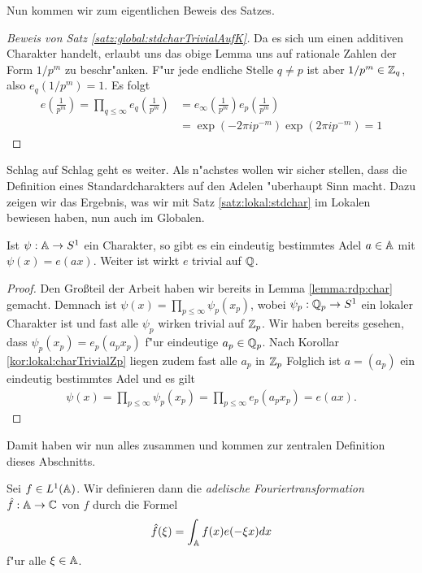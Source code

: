 	Nun kommen wir zum eigentlichen Beweis des Satzes.
	\begin{proof}[Beweis von Satz \ref{satz:global:stdcharTrivialAufK}]
		Da es sich um einen additiven Charakter handelt, erlaubt uns das obige Lemma uns auf rationale Zahlen der Form $1/p^m$ zu beschr"anken.
		F"ur jede endliche Stelle $q\not=p$ ist aber $1/p^m \in \mathbb{Z}_q$, also $e_q(1/p^m) =1$.
		Es folgt
		\begin{align*}
			e\left( \frac{1}{p^m} \right) 	= \prod_{q\leq \infty} e_q\left( \frac{1}{p^m} \right) 
											&= e_\infty \left( \frac{1}{p^m} \right) e_p\left( \frac{1}{p^m} \right)\\
											&= \exp(-2\pi i p^{-m}) \exp(2\pi i p^{-m}) = 1
		\end{align*}
	\end{proof}
	
	Schlag auf Schlag geht es weiter. 
	Als n"achstes wollen wir sicher stellen, dass die Definition eines Standardcharakters auf den Adelen "uberhaupt Sinn macht.
	Dazu zeigen wir das Ergebnis, was wir mit Satz \ref{satz:lokal:stdchar} im Lokalen bewiesen haben, nun auch im Globalen.
	\begin{satz}
		Ist $\psi: \mathbb{A} \to S^1$ ein Charakter, so gibt es ein eindeutig bestimmtes Adel $a\in\mathbb{A}$ mit $\psi(x) = e(ax)$.
		Weiter ist wirkt $e$ trivial auf $\mathbb{Q}$.
	\end{satz}
	\begin{proof}
		Den Großteil der Arbeit haben wir bereits in Lemma \ref{lemma:rdp:char} gemacht. Demnach ist $\psi(x) = \prod_{p\leq\infty} \psi_p (x_p)$, wobei $\psi_p: {\mathbb{Q}_p} \to S^1$ ein lokaler Charakter ist und fast alle $\psi_p$ wirken trivial auf ${\mathbb{Z}_p}$.
		Wir haben bereits gesehen, dass $\psi_p (x_p) = e_p(a_p x_p)$ f"ur eindeutige $a_p \in {\mathbb{Q}_p}$.
		Nach Korollar \ref{kor:lokal:charTrivialZp} liegen zudem fast alle $a_p$ in ${\mathbb{Z}_p}$
		Folglich ist $a = (a_p)$ ein eindeutig bestimmtes Adel und es gilt
		\begin{align*}
			\psi(x) = \prod_{p\leq\infty} \psi_p (x_p) = \prod_{p\leq\infty} e_p (a_px_p) = e(ax).
		\end{align*}
	\end{proof}
	Damit haben wir nun alles zusammen und kommen zur zentralen Definition dieses Abschnitts.
	
	\begin{defi}
		Sei $f\in L^1(\mathbb{A})$. Wir definieren dann die \emph{adelische Fouriertransformation} $\hat{f}: \mathbb{A} \to \mathbb{C}$ von $f$ durch die Formel
	\begin{align*}
		\hat{f}(\xi) = \int_{\mathbb{A}} f(x)e(-\xi x)  d{x}
	\end{align*}
	f"ur alle $\xi \in \mathbb{A}$.
	\end{defi}
	
